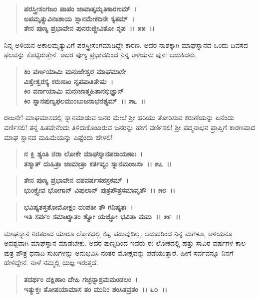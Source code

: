 \begin{verse}
\textbf{ಪರಸ್ತ್ರೀಸಂಗಜಂ ಪಾಪಂ ಜಾವಾತೃಮೃತಿಕಾರಣಮ್~।}\\\textbf{ಅಪಮೃತ್ಯುವಿನಾಶಾಯ ಸ್ನಾನಮೇಕದಿನೇ ಕೃತಮ್~। }\\\textbf{ತೇನ ಪುಣ್ಯ ಪ್ರಭಾವೇನ ಪುನರುಜ್ಜೀವಿತೋ ನೃಪ~।। ೫೫~।।}
\end{verse}

ನಿನ್ನ ಅಳಿಯನ ಅಕಾಲಮೃತ್ಯುವಿಗೆ ಪರಸ್ತ್ರೀಸಂಗಮಾಡಿದ್ದೇ ಕಾರಣ. ಅದರ ನಾಶಕ್ಕಾಗಿ ಮಾಘಸ್ನಾನದ ಒಂದು ದಿವಸದ ಫಲವನ್ನು ಕೊಟ್ಟಿರುತ್ತೇನೆ. ಅದರ ಪುಣ್ಯ ಪ್ರಭಾವದಿಂದ ನಿನ್ನ ಅಳಿಯನು ಪುನಃ ಬದುಕಿದನು.

\begin{verse}
\textbf{ಕಿಂ ವರ್ಣಯಾಮಿ ಮನುಜೇಶ್ವರ ಮಾಘಮಾಸೇ}\\\textbf{ವಿಶ್ವೇಶ್ವರಸ್ಯ ಕರುಣಾಂ ನೃಪಪಾತಿತೇಷು~। }\\\textbf{ಕಿಂ ವರ್ಣಯಾಮಿ ಮನುಜಾತ್ಮಹಿತಾನಭಿಜ್ಞಾನ್} \\\textbf{ಕಿಂ ಸ್ನಾನಪುಣ್ಯಫಲಮುಂಬುಜನಾಭನಶ್ಯಮ್~।। ೫೬~।।}
\end{verse}

ರಾಜನೇ! ಮಾಘಮಾಸದಲ್ಲಿ ಸ್ನಾನಮಾಡುವ ಜನರ ಮೇಲೆ ಶ‍್ರೀ ಹರಿಯು ತೋರಿಸುವ ಕರುಣೆಯನ್ನು ಏನೆಂದು ವರ್ಣಿಸಲಿ! ತನ್ನ ಹಿತವೇನೆಂದು ತಿಳಿದುಕೊಂಡಿರುವ ಜನರನ್ನು ಹೇಗೆ ವರ್ಣಿಸಲಿ! ಶ‍್ರೀ ಪದ್ಮನಾಭನ ಪ್ರಾಪ್ತಿಗೆ ಕಾರಣವಾದ ಮಾಘ ಸ್ನಾನದ ಮಹಿಮೆಯನ್ನು ಎಷ್ಟೆಂದು ಹೇಳಲಿ!

\begin{verse}
\textbf{ನ ಕ್ಲಿ ಶ್ಯಂತಿ ನರಾ ಲೋಕೇ ಮಾಘಸ್ನಾನಪರಾಯಣಾಃ~।}\\\textbf{ತಸ್ಮಾತ್ ದುಹಿತ್ರಾ ಜಾಮಾತ್ರಾ ಕರ್ತವ್ಯಂ ಸ್ನಾನಮಂಜಸಾ~।। ೫೭~।। }
\end{verse}

\begin{verse}
\textbf{ತೇನ ಪುಣ್ಯ ಪ್ರಭಾವೇನ ದಶವರ್ಷಸಹಸ್ರಕಮ್~।}\\\textbf{ಭುಂಕ್ತ್ಯೇವ ಭೋಗಾನ್ ವಿಪುಲಾನ್ ಪುತ್ರಪೌತ್ರಸಮಾವೃತೌ~।। ೫೮~।। }
\end{verse}

\begin{verse}
\textbf{ಭವಿಷ್ಯತಸ್ತತೋಮೋಕ್ಷಂ ದಂಪತೀ ತೌ ಗನಿಷ್ಯತಃ~।}\\\textbf{ಇತಿ ಸರ್ವಂ ಸಮಾಖ್ಯಾತಂ ಶ್ವೋ ಯಜ್ಞೋ ಭವಿತಾ ಮಮ~।। ೫೯~।।}
\end{verse}

ಮಾಘಸ್ನಾನ ನಿರತರಾದ ಯಾರೂ ಲೋಕದಲ್ಲಿ ಕಷ್ಟ ಪಡುವುದಿಲ್ಲ. ಆದುದರಿಂದ ನಿನ್ನ ಮಗಳೂ, ಅಳಿಯನೂ ಅವಶ್ಯವಾಗಿ ಮಾಘಸ್ನಾನ ಮಾಡಬೇಕು. ಅದರ ಪುಣ್ಯದಿಂದ ಇವರು ಈ ಲೋಕದಲ್ಲಿ ಹತ್ತು ಸಾವಿರ ವರ್ಷಗಳ ಕಾಲ ಪುತ್ರ ಪೌತ್ರ ಧನಾದಿ ಸುಖಗಳನ್ನು ಅನುಭವಿಸಿ ನಂತರ ಮೋಕ್ಷವನ್ನು ಪಡೆಯುತ್ತಾರೆ. ಹೀಗೆ ಸರ್ವವನ್ನೂ ನಿನಗೆ ಹೇಳಿದ್ದೇನೆ. ನಾಳೆ ನಮ್ಮಲ್ಲಿ ಯಜ್ಞ ಇರುತ್ತದೆ.

\begin{verse}
\textbf{ತದರ್ಥಂ ದಕ್ಷಿಣಾಂ ದೇಹಿ ಗಚ್ಛನ್ನಾಶ್ರಮಮಂಡಲಂ~।}\\\textbf{ಇತ್ಯುಕ್ತಃ ತೋಷಯಾಮಾಸ ತಂ ಮುನಿಂ ಶಂಸಿತವ್ರತಂ~।। ೬೦~।। }
\end{verse}

